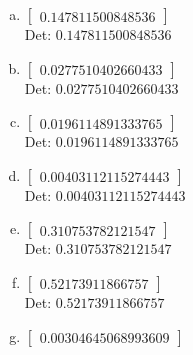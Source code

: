 \documentclass[12pt]{article}
\begin{document}
\begin{enumerate}[a)]

\item $\displaystyle \left[\begin{matrix}0.147811500848536\end{matrix}\right]$\\

Det: $0.147811500848536$\\

\item $\displaystyle \left[\begin{matrix}0.0277510402660433\end{matrix}\right]$\\

Det: $0.0277510402660433$\\

\item $\displaystyle \left[\begin{matrix}0.0196114891333765\end{matrix}\right]$\\

Det: $0.0196114891333765$\\

\item $\displaystyle \left[\begin{matrix}0.00403112115274443\end{matrix}\right]$\\

Det: $0.00403112115274443$\\

\item $\displaystyle \left[\begin{matrix}0.310753782121547\end{matrix}\right]$\\

Det: $0.310753782121547$\\

\item $\displaystyle \left[\begin{matrix}0.52173911866757\end{matrix}\right]$\\

Det: $0.52173911866757$\\

\item $\displaystyle \left[\begin{matrix}0.00304645068993609\end{matrix}\right]$\\


\end{enumerate}
\end{document}
